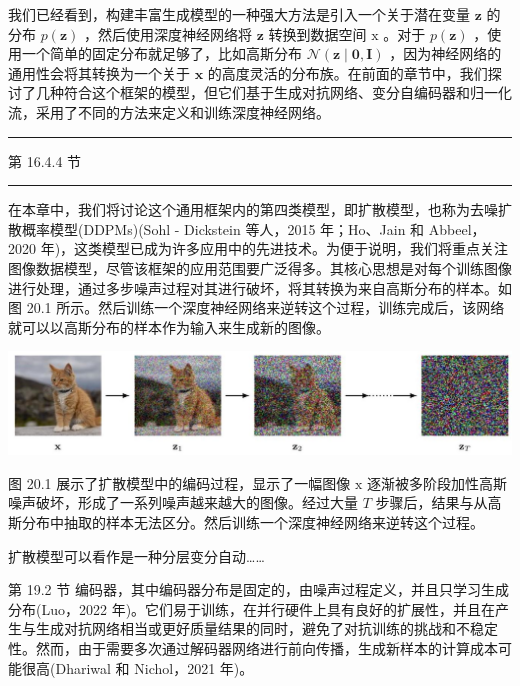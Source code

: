 \documentclass[10pt]{report}
\newcommand{\HRule}{\begin{center}\rule{0.9\linewidth}{0.2mm}\end{center}}
\begin{document}
我们已经看到，构建丰富生成模型的一种强大方法是引入一个关于潜在变量 \(\mathbf{z}\) 的分布 \(p\left( \mathbf{z}\right)\) ，然后使用深度神经网络将 \(\mathbf{z}\) 转换到数据空间 \(\mathrm{x}\) 。对于 \(p\left( \mathbf{z}\right)\) ，使用一个简单的固定分布就足够了，比如高斯分布 \(\mathcal{N}\left( {\mathbf{z} \mid  \mathbf{0},\mathbf{I}}\right)\) ，因为神经网络的通用性会将其转换为一个关于 \(\mathbf{x}\) 的高度灵活的分布族。在前面的章节中，我们探讨了几种符合这个框架的模型，但它们基于生成对抗网络、变分自编码器和归一化流，采用了不同的方法来定义和训练深度神经网络。

\HRule

第 16.4.4 节

\HRule

在本章中，我们将讨论这个通用框架内的第四类模型，即扩散模型，也称为去噪扩散概率模型(DDPMs)(Sohl - Dickstein 等人，2015 年；Ho、Jain 和 Abbeel，2020 年)，这类模型已成为许多应用中的先进技术。为便于说明，我们将重点关注图像数据模型，尽管该框架的应用范围要广泛得多。其核心思想是对每个训练图像进行处理，通过多步噪声过程对其进行破坏，将其转换为来自高斯分布的样本。如图 20.1 所示。然后训练一个深度神经网络来逆转这个过程，训练完成后，该网络就可以以高斯分布的样本作为输入来生成新的图像。

\begin{center}
\includegraphics[max width=1.0\textwidth]{images/0194e279-9b28-703a-88f4-c3ac21e2010d_601_227_356_1339_276_0.jpg}
\end{center}
\hspace*{3em} 

图 20.1 展示了扩散模型中的编码过程，显示了一幅图像 \(\mathrm{x}\) 逐渐被多阶段加性高斯噪声破坏，形成了一系列噪声越来越大的图像。经过大量 \(T\) 步骤后，结果与从高斯分布中抽取的样本无法区分。然后训练一个深度神经网络来逆转这个过程。

扩散模型可以看作是一种分层变分自动……

第 19.2 节 编码器，其中编码器分布是固定的，由噪声过程定义，并且只学习生成分布(Luo，2022 年)。它们易于训练，在并行硬件上具有良好的扩展性，并且在产生与生成对抗网络相当或更好质量结果的同时，避免了对抗训练的挑战和不稳定性。然而，由于需要多次通过解码器网络进行前向传播，生成新样本的计算成本可能很高(Dhariwal 和 Nichol，2021 年)。
\end{document}
